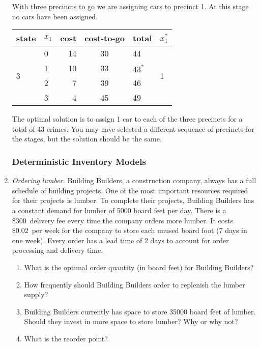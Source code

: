 \begin{enumerate}
\begin{solution}
  With three precincts to go we are assigning cars to precinct 1. At this
  stage no cars have been assigned.

  \begin{tabular}{llrcll}
    state & $x_1$ & cost & cost-to-go & total & $x_1^{\ast}$ \\ \hline
    \multirow{4}{*}{3} & 0 & 14 & 30 & 44 & \multirow{4}{*}{1} \\
          & 1 & 10 & 33 & $43^{\ast}$ & \\
          & 2 & 7 & 39 & 46 & \\
          & 3 & 4 & 45 & 49 &
  \end{tabular}

  The optimal solution is to assign 1 car to each of the three
  precincts for a total of 43 crimes. You may have selected a
  different sequence of precincts for the stages, but the solution
  should be the same.
\end{solution}

\subsubsection*{Deterministic Inventory Models}

\item \emph{Ordering lumber.}  Building Builders, a construction
  company, always has a full schedule of building projects.  One of
  the most important resources required for their projects is
  lumber. To complete their projects, Building Builders has a constant
  demand for lumber of \num{5000} board feet per day.  There is a
  \$300\ delivery fee every time the company orders more lumber. It
  costs \$0.02\ per week for the company to store each unused board
  foot (7 days in one week). Every order has a lead time of 2 days to
  account for order processing and delivery time.

\begin{enumerate}
\item What is the optimal order quantity (in board feet) for Building
  Builders?
\item How frequently should Building Builders order to replenish the
  lumber supply?
\item Building Builders currently has space to store \num{35000} board
  feet of lumber. Should they invest in more space to store lumber?
  Why or why not?
\item What is the reorder point?
\end{enumerate}


\end{enumerate}
